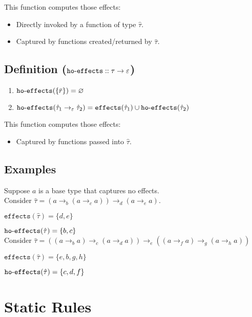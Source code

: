 \documentclass{llncs}
\newcommand{\keywadj}[1]{\mathtt{#1}}
\newcommand{\kwa}[1]{\keywadj{ #1 }}
\newcommand{\hyphen}{\hbox{-}}
\begin{document}
\noindent
This function computes those effects:
\begin{itemize}
	\item Directly invoked by a function of type $\hat \tau$.
	\item Captured by functions created/returned by $\hat \tau$.
\end{itemize}

\subsection*{Definition ($\kwa{ho \hyphen effects :: \tau \rightarrow \varepsilon}$)}

\begin{enumerate}
	\item $\kwa{ho \hyphen effects}(\{ \bar r \}) = \varnothing$
	\item $\kwa{ho \hyphen effects}(\hat \tau_1 \rightarrow_{\varepsilon} \hat \tau_2) = \kwa{effects}(\hat \tau_1) \cup \kwa{ho \hyphen effects}(\hat \tau_2)$
\end{enumerate}

\noindent
This function computes those effects:
\begin{itemize}
	\item Captured by functions passed into $\hat \tau$.
\end{itemize}

\subsection*{Examples}

Suppose $a$ is a base type that captures no effects. \\

\noindent
Consider $\hat \tau = (a \rightarrow_b (a \rightarrow_c a)) \rightarrow_d (a \rightarrow_e a)$.

$\kwa{effects}(\hat \tau) = \{ d, e \}$

$\kwa{ho \hyphen effects}(\hat \tau) = \{ b, c \}$ \\

\noindent
Consider $\hat \tau = ((a \rightarrow_b a) \rightarrow_c (a \rightarrow_d a)) \rightarrow_e ((a \rightarrow_f a) \rightarrow_g (a \rightarrow_h a))$

$\kwa{effects}(\hat \tau) = \{ e, b, g, h \}$

$\kwa{ho \hyphen effects}(\hat \tau) = \{ c, d, f \}$

\section{Static Rules}
\end{document}
